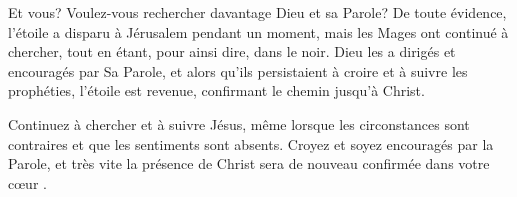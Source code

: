 Et vous? Voulez-vous rechercher davantage Dieu et sa Parole? De toute évidence, l'étoile a disparu à Jérusalem pendant un moment, mais les Mages ont continué à chercher, tout en étant, pour ainsi dire, dans le noir. Dieu les a dirigés et encouragés par Sa Parole, et alors qu'ils persistaient à croire et à suivre les prophéties, l'étoile est revenue, confirmant le chemin jusqu'à Christ.

Continuez à chercher et à suivre Jésus, même lorsque les circonstances sont contraires et que les sentiments sont absents. Croyez et soyez encouragés par la Parole, et très vite la présence de Christ sera de nouveau confirmée dans votre cœur .

\enlargethispage{5\baselineskip}

